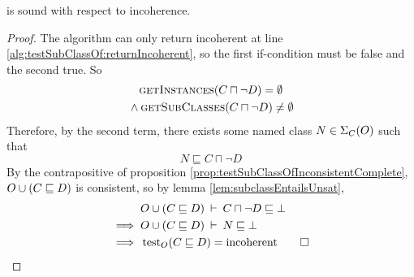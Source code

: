 \documentclass[paper.tex]{subfiles}
\begin{document}
\begin{proposition}
  \label{prop:testSubClassOfIncoherentSound}
   is sound with respect to incoherence.
\end{proposition}
\begin{proof}
  The algorithm can only return incoherent at line \ref{alg:testSubClassOf:returnIncoherent}, so the first if-condition must be false and the second true.  So
  \begin{multline*}
    \Call{getInstances}{C \sqcap \neg D} = \emptyset \\
    {} \land \Call{getSubClasses}{C \sqcap \neg D} \ne \emptyset
  \end{multline*}
  Therefore, by the second term, there exists some named class $N \in \Sigma_C(O)$ such that
  \[ N \sqsubseteq C \sqcap \neg D \]
  By the contrapositive of proposition \ref{prop:testSubClassOfInconsistentComplete}, $O \cup (C \sqsubseteq D)$ is consistent, so by lemma \ref{lem:subclassEntailsUnsat},
  \begin{align*}
    & O \cup (C \sqsubseteq D) \:\vdash\: C \sqcap \neg D \sqsubseteq \bot \\
    \implies{}& O \cup (C \sqsubseteq D) \:\vdash\: N \sqsubseteq \bot \\
    \implies{}& \operatorname{test}_O(C \sqsubseteq D) = \mathrm{incoherent}
    \qed
  \end{align*}
\end{proof}
\end{document}
